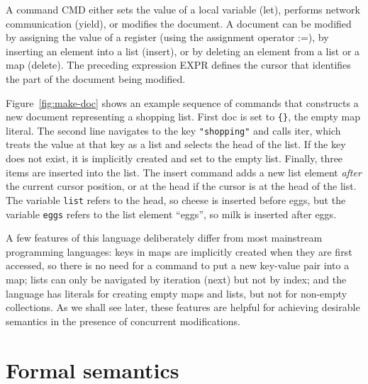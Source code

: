 \documentclass[a4paper,twocolumn,10pt]{article}
\begin{document}
A command CMD either sets the value of a local variable (\textsf{let}), performs network communication (\textsf{yield}), or modifies the document. A document can be modified by assigning the value of a register (using the assignment operator :=), by inserting an element into a list (\textsf{insert}), or by deleting an element from a list or a map (\textsf{delete}). The preceding expression EXPR defines the cursor that identifies the part of the document being modified.

Figure~\ref{fig:make-doc} shows an example sequence of commands that constructs a new document representing a shopping list. First \textsf{doc} is set to \verb|{}|, the empty map literal. The second line navigates to the key \verb|"shopping"| and calls \textsf{iter}, which treats the value at that key as a list and selects the head of the list. If the key does not exist, it is implicitly created and set to the empty list. Finally, three items are inserted into the list. The \textsf{insert} command adds a new list element \emph{after} the current cursor position, or at the head if the cursor is at the head of the list. The variable \verb|list| refers to the head, so cheese is inserted before eggs, but the variable \verb|eggs| refers to the list element ``eggs'', so milk is inserted after eggs.

A few features of this language deliberately differ from most mainstream programming languages: keys in maps are implicitly created when they are first accessed, so there is no need for a command to put a new key-value pair into a map; lists can only be navigated by iteration (\textsf{next}) but not by index; and the language has literals for creating empty maps and lists, but not for non-empty collections. As we shall see later, these features are helpful for achieving desirable semantics in the presence of concurrent modifications.

\section{Formal semantics}
\end{document}
